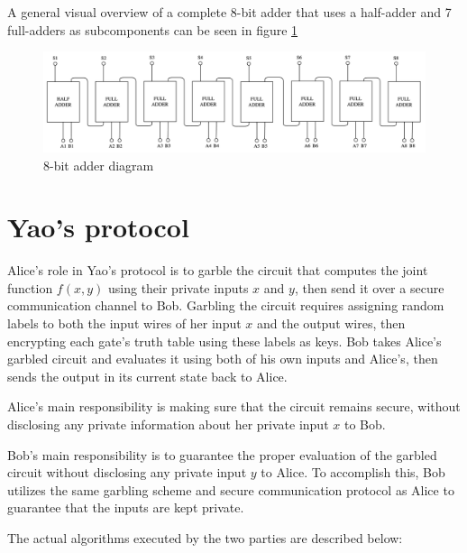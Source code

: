 \documentclass[12pt]{article}
\begin{document}
A general visual overview of a complete 8-bit adder that uses a half-adder and 7 full-adders as subcomponents can be seen in figure \ref{fig:adder} 

\begin{figure}[h]
  \centering
  \includegraphics[width=\textwidth]{adder.png}
  \caption{8-bit adder diagram}\label{fig:adder}
\end{figure}



\section{Yao's protocol}

Alice's role in Yao's protocol \cite{YAO} is to garble the circuit that computes the joint function $f(x,y)$ using their private inputs $x$ and $y$, then send it over a secure communication channel to Bob. Garbling the circuit requires assigning random labels to both the input wires of her input $x$ and the output wires, then encrypting each gate's truth table using these labels as keys. Bob takes Alice's garbled circuit and evaluates it using both of his own inputs and Alice's, then sends the output in its current state back to Alice.

Alice's main responsibility is making sure that the circuit remains secure, without disclosing any private information about her private input $x$ to Bob.

Bob's main responsibility is to guarantee the proper evaluation of the garbled circuit without disclosing any private input $y$ to Alice. To accomplish this, Bob utilizes the same garbling scheme and secure communication protocol as Alice to guarantee that the inputs are kept private.

The actual algorithms executed by the two parties are described below:
\end{document}
